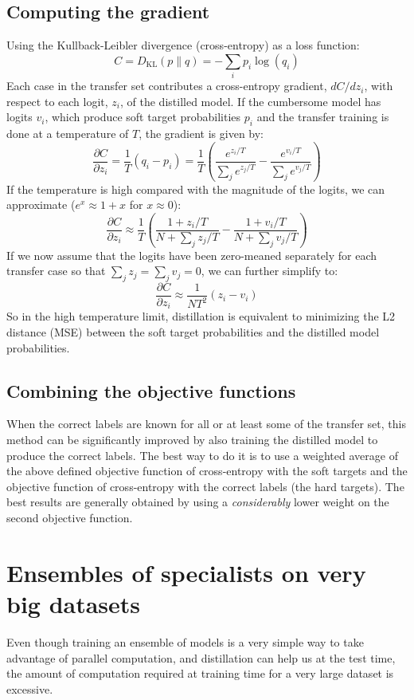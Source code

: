 \documentclass[a4paper,twocolumn]{article}
\begin{document}
\subsection{Computing the gradient}
Using the Kullback-Leibler divergence (cross-entropy) as a loss function:
\[
    C = D_{\mathrm{KL}}(p\|q) = - \sum_i p_i \log(q_i)
\]
Each case in the transfer set contributes a cross-entropy gradient, $dC/dz_i$, with respect to each logit, $z_i$, of the distilled model. If the cumbersome model has logits $v_i$, which produce soft target probabilities $p_i$ and the transfer training is done at a temperature of $T$, the gradient is given by:
\[
    \frac{\partial C}{\partial z_i} = \frac{1}{T}(q_i - p_i) = \frac{1}{T}\left( \frac{e^{z_i/T}}{\sum_j e^{z_j/T}} - \frac{e^{v_i/T}}{\sum_j e^{v_j/T}} \right)
\]
If the temperature is high compared with the magnitude of the logits, we can approximate ($e^x \approx 1+x$ for $x \approx 0$):
\[
    \frac{\partial C}{\partial z_i} \approx \frac{1}{T}\left( \frac{1 + z_i/T}{N + \sum_j z_j/T} - \frac{1 + v_i/T}{N + \sum_j v_j/T} \right)
\]
If we now assume that the logits have been zero-meaned separately for each transfer case so that $\sum_j z_j = \sum_j v_j = 0$, we can further simplify to:
\[
    \frac{\partial C}{\partial z_i} \approx \frac{1}{NT^2} (z_i - v_i)
\]
So in the high temperature limit, distillation is equivalent to minimizing the L2 distance (MSE) between the soft target probabilities and the distilled model probabilities.

\subsection{Combining the objective functions}
When the correct labels are known for all or at least some of the transfer set, this method can be significantly improved by also training the distilled model to produce the correct labels. The best way to do it is to use a weighted average of the above defined objective function of cross-entropy with the soft targets and the objective function of cross-entropy with the correct labels (the hard targets). The best results are generally obtained by using a \textit{considerably} lower weight on the second objective function.

\section{Ensembles of specialists on very big datasets}
Even though training an ensemble of models is a very simple way to take advantage of parallel computation, and distillation can help us at the test time, the amount of computation required at training time for a very large dataset is excessive.
\end{document}
